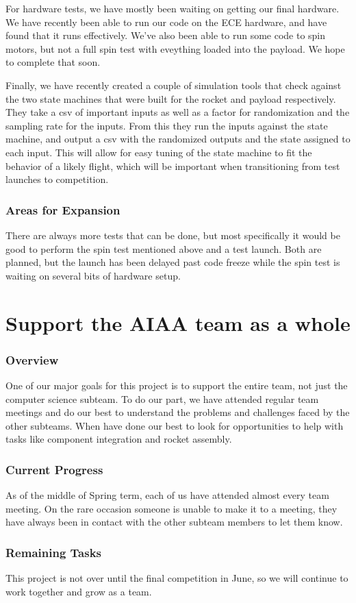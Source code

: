 \documentclass[onecolumn, draftclsnofoot, 10pt, compsoc]{IEEEtran}
\begin{document}
For hardware tests, we have mostly been waiting on getting our final hardware. We have recently been able to run our code on the ECE hardware, and have found that it runs effectively. We've also been able to run some code to spin motors, but not a full spin test with eveything loaded into the payload. We hope to complete that soon.

Finally, we have recently created a couple of simulation tools that check against the two state machines that were built for the rocket and payload respectively. They take a csv of important inputs as well as a factor for randomization and the sampling rate for the inputs. From this they run the inputs against the state machine, and output a csv with the randomized outputs and the state assigned to each input. This will allow for easy tuning of the state machine to fit the behavior of a likely flight, which will be important when transitioning from test launches to competition.

\subsubsection{Areas for Expansion}
There are always more tests that can be done, but most specifically it would be good to perform the spin test mentioned above and a test launch. Both are planned, but the launch has been delayed past code freeze while the spin test is waiting on several bits of hardware setup.

\section{Support the AIAA team as a whole}
\subsubsection{Overview}
One of our major goals for this project is to support the entire team, not just the computer science subteam.  To do our part, we have attended regular team meetings and do our best to understand the problems and challenges faced by the other subteams.  When have done our best to look for opportunities to help with tasks like component integration and rocket assembly.

\subsubsection{Current Progress}
As of the middle of Spring term, each of us have attended almost every team meeting.  On the rare occasion someone is unable to make it to a meeting, they have always been in contact with the other subteam members to let them know.

\subsubsection{Remaining Tasks}
This project is not over until the final competition in June, so we will continue to work together and grow as a team.

\end{document}
